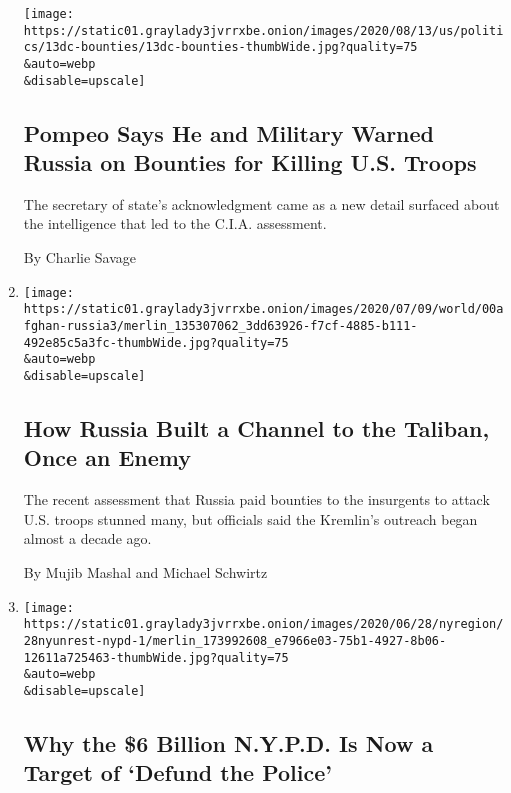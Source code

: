 \begin{enumerate}
  \texttt{[image: https://static01.graylady3jvrrxbe.onion/images/2020/08/13/us/politics/13dc-bounties/13dc-bounties-thumbWide.jpg?quality=75\\\&auto=webp\\\&disable=upscale]}

  \hypertarget{pompeo-says-he-and-military-warned-russia-on-bounties-for-killing-us-troops}{%
  \subsection{Pompeo Says He and Military Warned Russia on Bounties for
  Killing U.S.
  Troops}\label{pompeo-says-he-and-military-warned-russia-on-bounties-for-killing-us-troops}}

  The secretary of state's acknowledgment came as a new detail surfaced
  about the intelligence that led to the C.I.A. assessment.

  By Charlie Savage
\item
  \href{/2020/07/13/world/asia/russia-taliban-afghanistan.html}{}

  \texttt{[image: https://static01.graylady3jvrrxbe.onion/images/2020/07/09/world/00afghan-russia3/merlin\_135307062\_3dd63926-f7cf-4885-b111-492e85c5a3fc-thumbWide.jpg?quality=75\\\&auto=webp\\\&disable=upscale]}

  \hypertarget{how-russia-built-a-channel-to-the-taliban-once-an-enemy}{%
  \subsection{How Russia Built a Channel to the Taliban, Once an
  Enemy}\label{how-russia-built-a-channel-to-the-taliban-once-an-enemy}}

  The recent assessment that Russia paid bounties to the insurgents to
  attack U.S. troops stunned many, but officials said the Kremlin's
  outreach began almost a decade ago.

  By Mujib Mashal and Michael Schwirtz
\item
  \href{/2020/06/28/nyregion/nypd-budget-defund-police.html}{}

  \texttt{[image: https://static01.graylady3jvrrxbe.onion/images/2020/06/28/nyregion/28nyunrest-nypd-1/merlin\_173992608\_e7966e03-75b1-4927-8b06-12611a725463-thumbWide.jpg?quality=75\\\&auto=webp\\\&disable=upscale]}

  \hypertarget{why-the-6-billion-nypd-is-now-a-target-of-defund-the-police}{%
  \subsection{Why the \$6 Billion N.Y.P.D. Is Now a Target of `Defund
  the
  Police'}\label{why-the-6-billion-nypd-is-now-a-target-of-defund-the-police}}


\end{enumerate}
